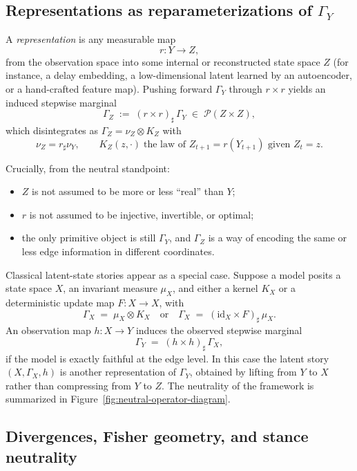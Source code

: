 \documentclass[11pt]{article}
\newcommand{\1}{\mathbf{1}}
\begin{document}
\subsection{Representations as reparameterizations of \texorpdfstring{$\Gamma_Y$}{Gamma\_data}}
\label{subsec:representations}

A \emph{representation} is any measurable map
\[
  r : Y \longrightarrow Z,
\]
from the observation space into some internal or reconstructed state space $Z$ (for instance, a delay embedding, a low-dimensional latent learned by an autoencoder, or a hand-crafted feature map). Pushing forward $\Gamma_Y$ through $r\times r$ yields an induced stepwise marginal
\[
  \Gamma_Z
  \;:=\;
  (r\times r)_{\sharp}\,\Gamma_Y
  \;\in\; \mathcal{P}(Z\times Z),
\]
which disintegrates as $\Gamma_Z = \nu_Z\otimes K_Z$ with
\[
  \nu_Z = r_{\sharp}\nu_Y,
  \qquad
  K_Z(z,\cdot)
  \;\text{the law of } Z_{t+1}=r(Y_{t+1}) \text{ given } Z_t=z.
\]

Crucially, from the neutral standpoint:
\begin{itemize}[leftmargin=1.5em]
  \item $Z$ is not assumed to be more or less ``real'' than $Y$;
  \item $r$ is not assumed to be injective, invertible, or optimal;
  \item the only primitive object is still $\Gamma_Y$, and $\Gamma_Z$ is a way of encoding the same or less edge information in different coordinates.
\end{itemize}

Classical latent-state stories appear as a special case. Suppose a model posits a state space $X$, an invariant measure $\mu_X$, and either a kernel $K_X$ or a deterministic update map $F:X\to X$, with
\[
  \Gamma_X \;=\; \mu_X \otimes K_X
  \quad \text{or} \quad
  \Gamma_X \;=\; (\mathrm{id}_X\times F)_{\sharp}\,\mu_X.
\]
An observation map $h:X\to Y$ induces the observed stepwise marginal
\[
  \Gamma_Y
  \;=\;
  (h\times h)_{\sharp}\,\Gamma_X,
\]
if the model is exactly faithful at the edge level. In this case the latent story $(X,\Gamma_X,h)$ is another representation of $\Gamma_Y$, obtained by lifting from $Y$ to $X$ rather than compressing from $Y$ to $Z$. The neutrality of the framework is summarized in Figure~\ref{fig:neutral-operator-diagram}.

\subsection{Divergences, Fisher geometry, and stance neutrality}
\label{subsec:divergence-fisher}
\end{document}

